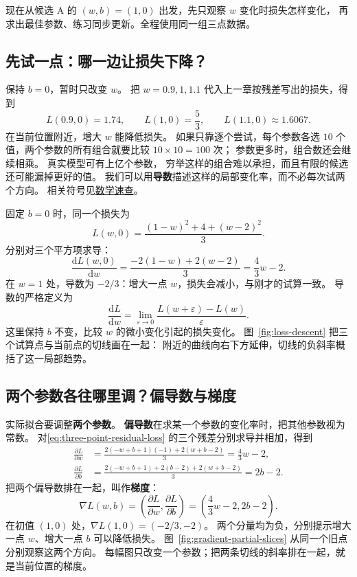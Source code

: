 现在从候选 A 的 $(w,b)=(1,0)$ 出发，先只观察 $w$ 变化时损失怎样变化，
再求出最佳参数、练习同步更新。全程使用同一组三点数据。

\subsection{先试一点：哪一边让损失下降？}

保持 $b=0$，暂时只改变 $w$。
把 $w=0.9,1,1.1$ 代入上一章按残差写出的损失，得到
\[
L(0.9,0)=1.74,\qquad L(1,0)=\frac53,\qquad L(1.1,0)\approx1.6067.
\]
在当前位置附近，增大 $w$ 能降低损失。
如果只靠逐个尝试，每个参数各选 $10$ 个值，两个参数的所有组合就要比较 $10\times10=100$ 次；
参数更多时，组合数还会继续相乘。
真实模型可有上亿个参数，
穷举这样的组合难以承担，而且有限的候选还可能漏掉更好的值。
我们可以用\textbf{导数}描述这样的局部变化率，而不必每次试两个方向。
相关符号见\hyperref[app:math-tools]{数学速查}。

固定 $b=0$ 时，同一个损失为
\[
L(w,0)=\frac{(1-w)^2+4+(w-2)^2}{3}.
\]
分别对三个平方项求导：
\[
\frac{\mathrm dL(w,0)}{\mathrm dw}
=\frac{-2(1-w)+2(w-2)}{3}
=\frac43w-2.
\]
在 $w=1$ 处，导数为 $-2/3$：增大一点 $w$，损失会减小，与刚才的试算一致。
导数的严格定义为
\[
\frac{\mathrm dL}{\mathrm dw}
=\lim_{\varepsilon\to0}\frac{L(w+\varepsilon)-L(w)}{\varepsilon}.
\]
这里保持 $b$ 不变，比较 $w$ 的微小变化引起的损失变化。
图~\ref{fig:loss-descent} 把三个试算点与当前点的切线画在一起：
附近的曲线向右下方延伸，切线的负斜率概括了这一局部趋势。


\subsection{两个参数各往哪里调？偏导数与梯度}
\label{concept:gradient}

实际拟合要调整\textbf{两个参数}。
\textbf{偏导数}在求某一个参数的变化率时，把其他参数视为常数。
对\eqref{eq:three-point-residual-loss} 的三个残差分别求导并相加，得到
\[
\begin{aligned}
\frac{\partial L}{\partial w}
&=\frac{2(-w+b+1)(-1)+2(w+b-2)}{3}=\frac43w-2,\\
\frac{\partial L}{\partial b}
&=\frac{2(-w+b+1)+2(b-2)+2(w+b-2)}{3}=2b-2.
\end{aligned}
\]
把两个偏导数排在一起，叫作\textbf{梯度}：
\[
\nabla L(w,b)=\left(\frac{\partial L}{\partial w},\frac{\partial L}{\partial b}\right)
=\left(\frac43w-2,2b-2\right).
\]
在初值 $(1,0)$ 处，$\nabla L(1,0)=\boxed{(-2/3,-2)}$。
两个分量均为负，分别提示增大一点 $w$、增大一点 $b$ 可以降低损失。
图~\ref{fig:gradient-partial-slices} 从同一个旧点分别观察这两个方向。
每幅图只改变一个参数；把两条切线的斜率排在一起，就是当前位置的梯度。



